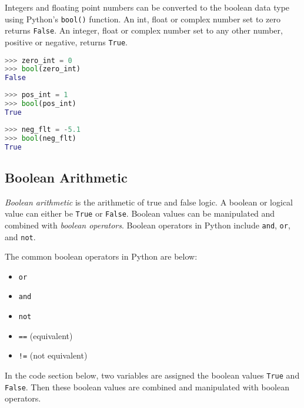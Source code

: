 \documentclass{book}
\providecommand{\tightlist}{%
      \setlength{\itemsep}{0pt}\setlength{\parskip}{0pt}}
\newcommand{\passthrough}[1]{#1}
\begin{document}
Integers and floating point numbers can be converted to the boolean data
type using Python's \passthrough{\lstinline!bool()!} function. An int,
float or complex number set to zero returns
\passthrough{\lstinline!False!}. An integer, float or complex number set
to any other number, positive or negative, returns
\passthrough{\lstinline!True!}.

\begin{lstlisting}[language=Python]
>>> zero_int = 0
>>> bool(zero_int)
False
\end{lstlisting}

\begin{lstlisting}[language=Python]
>>> pos_int = 1
>>> bool(pos_int)
True
\end{lstlisting}

\begin{lstlisting}[language=Python]
>>> neg_flt = -5.1
>>> bool(neg_flt)
True
\end{lstlisting}
    




    
        \hypertarget{boolean-arithmetic}{%
\subsection{Boolean Arithmetic}\label{boolean-arithmetic}}

\emph{Boolean arithmetic} is the arithmetic of true and false logic. A
boolean or logical value can either be \passthrough{\lstinline!True!} or
\passthrough{\lstinline!False!}. Boolean values can be manipulated and
combined with \emph{boolean operators}. Boolean operators in Python
include \passthrough{\lstinline!and!}, \passthrough{\lstinline!or!}, and
\passthrough{\lstinline!not!}.

The common boolean operators in Python are below:

\begin{itemize}
\tightlist
\item
  \passthrough{\lstinline!or!}
\item
  \passthrough{\lstinline!and!}
\item
  \passthrough{\lstinline!not!}
\item
  \passthrough{\lstinline!==!} (equivalent)
\item
  \passthrough{\lstinline"!="} (not equivalent)
\end{itemize}

In the code section below, two variables are assigned the boolean values
\passthrough{\lstinline!True!} and \passthrough{\lstinline!False!}. Then
these boolean values are combined and manipulated with boolean
operators.
\end{document}

